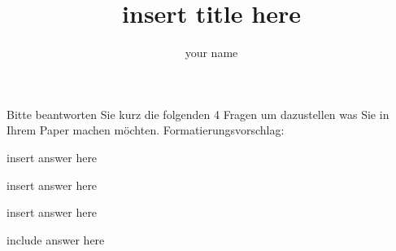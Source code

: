 \documentclass[
    ngerman,american
    ]{scrartcl}
\title{
        insert title here
        \\  \Large{\paperSubTitle{\lang}}}
\author{
        your name
        }
\newcommand{\lang}{en}
\begin{document}
      \maketitle
        \begin{abstract}
            \blindtext

        \end{abstract}
        
        
        \sectionQuestions{\lang}
        Bitte beantworten Sie kurz die folgenden 4 Fragen um dazustellen was Sie in Ihrem Paper machen möchten.
        Formatierungsvorschlag:
        
        \begin{description}[style=unboxed]
            \item [\questionOne{\lang}] 
                insert answer here

            \item [\questionTwo{\lang}]
                insert answer here

            \item [\questionThree{\lang}]
                insert answer here

            \item [\questionFour{\lang}]
                include answer here
        \end{description}
        
\end{document}
